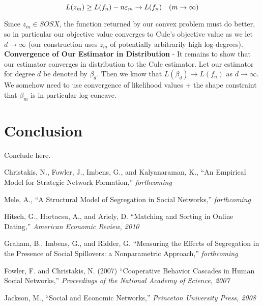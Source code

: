 \documentclass[11pt,reqno]{amsart}
\numberwithin{equation}{section}
\newcommand{\tb}{\textbf}
\newcommand{\be}{\beta}
\begin{document}
\[
L(z_m) \geq L(f_n) - n \varepsilon_m \rightarrow L(f_n) \quad (m \rightarrow \infty) 
\]

Since $z_m \in SOSX$, the function returned by our convex problem must do better, so in particular our objective value converges to Cule's objective value as we let $d \to \infty$ (our construction uses $z_m$ of potentially arbitrarily high log-degrees). \\

\tb{Convergence of Our Estimator in Distribution} - It remains to show that our estimator converges in distribution to the Cule estimator. Let our estimator for degree $d$ be denoted by $\be_d$. Then we know that $L(\be_d) \to L(f_n)$ as $d \to \infty$. We somehow need to use convergence of likelihood values + the shape constraint that $\beta_m$ is in particular log-concave. \\

\section{Conclusion} Conclude here. 








\begin{thebibliography}{9}

Christakis, N., Fowler, J., Imbens, G., and Kalyanaraman, K., 
``An Empirical Model for Strategic Network Formation,'' 
\emph{forthcoming} 

Mele, A., 
``A Structural Model of Segregation in Social Networks,'' 
\emph{forthcoming} 

Hitsch, G., Hortacsu, A., and Ariely, D. 
``Matching and Sorting in Online Dating,'' 
\emph{American Economic Review, 2010} 

Graham, B., Imbens, G., and Ridder, G. 
``Measuring the Effects of Segregation in the Presence of Social Spillovers: a Nonparametric Approach,'' 
\emph{forthcoming} 

Fowler, F. and Christakis, N. (2007) 
``Cooperative Behavior Cascades in Human Social Networks,'' 
\emph{Proceedings of the National Academy of Science, 2007} 

Jackson, M., 
``Social and Economic Networks,'' 
\emph{Princeton University Press, 2008} 



	
\end{thebibliography}
\end{document}
